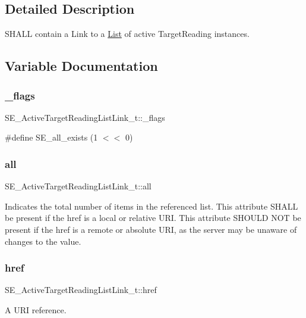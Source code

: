 \subsection{Detailed Description}
S\+H\+A\+LL contain a Link to a \hyperlink{structList}{List} of active Target\+Reading instances. 

\subsection{Variable Documentation}
\mbox{\label{group__ActiveTargetReadingListLink_ga40bd728c6927ba6addca7bee573a5386}} 
\subsubsection{\texorpdfstring{\+\_\+flags}{\_flags}}
{\footnotesize\ttfamily S\+E\+\_\+\+Active\+Target\+Reading\+List\+Link\+\_\+t\+::\+\_\+flags}

\#define S\+E\+\_\+all\+\_\+exists (1 $<$$<$ 0) \mbox{\label{group__ActiveTargetReadingListLink_gacaadf42bb01e65b4e8b1c76df59e38af}} 
\subsubsection{\texorpdfstring{all}{all}}
{\footnotesize\ttfamily S\+E\+\_\+\+Active\+Target\+Reading\+List\+Link\+\_\+t\+::all}

Indicates the total number of items in the referenced list. This attribute S\+H\+A\+LL be present if the href is a local or relative U\+RI. This attribute S\+H\+O\+U\+LD N\+OT be present if the href is a remote or absolute U\+RI, as the server may be unaware of changes to the value. \mbox{\label{group__ActiveTargetReadingListLink_ga48381c17bdb45f1d5529dcf34049108d}} 
\subsubsection{\texorpdfstring{href}{href}}
{\footnotesize\ttfamily S\+E\+\_\+\+Active\+Target\+Reading\+List\+Link\+\_\+t\+::href}

A U\+RI reference. 